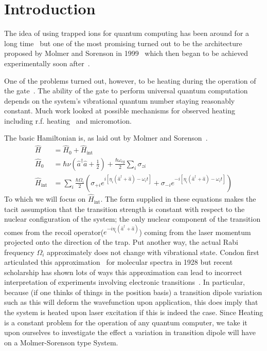 \section{Introduction}

The idea of using trapped ions for quantum computing has been around for a long time~\cite{Shore1993,Meekhof1996} but one of the most promising turned out to be the architecture proposed by Molmer and Sorenson in 1999~\cite{MolmerSorenson} which then began to be achieved experimentally soon after~\cite{Wineland2000,Monroe2000}.

One of the problems turned out, however, to be heating during the operation of the gate~\cite{Berkeland1998,HAFFNER2008,Johnson2016}.  The ability of the gate to perform universal quantum computation depends on the system's vibrational quantum number staying reasonably constant.  Much work looked at possible mechanisms for observed heating including r.f. heating~\cite{Turchette2000} and micromotion.

The basic Hamiltonian is, as laid out by Molmer and Sorenson~\cite{MolmerSorenson}.
\begin{align*}
  \hat{H} &= \hat{H}_0 + \hat{H}_{\text{int}} \\
  \hat{H}_0 &= \hbar \nu \left(  \hat{a}^{\dagger} \hat{a}   + \frac{1}{2}\right)  + \frac{\hbar \omega_{eg}}{2} \sum_{i} \sigma_{zi} \\
  \hat{H}_{\text{int}} &= \sum_{i} \frac{\hbar \Omega_i}{2} \left( \sigma_{+i} e^{i \left[ \eta_i \left( \hat{a}^{\dagger} + \hat{a} \right) - \omega_i t \right]}  +  \sigma_{-i} e^{-i \left[ \eta_i \left( \hat{a}^{\dagger} + \hat{a} \right) - \omega_i t \right]} \right)
\end{align*}
To which we will focus on $\hat{H}_{\text{int}}$.  The form supplied in these equations makes the tacit assumption that the transition strength is constant with respect to the nuclear configuration of the system; the only nuclear component of the transition comes from the recoil operator($e^{-i  \eta_i \left( \hat{a}^{\dagger} + \hat{a} \right) }$) coming from the laser momentum projected onto the direction of the trap.  Put another way, the actual Rabi frequency $\Omega_i$ approximately does not change with vibrational state.  Condon first articulated this approximation~\cite{Condon} for molecular spectra in 1928 but recent scholarship has shown lots of ways this approximation can lead to incorrect interpretation of experiments involving electronic transitions~\cite{MavrosNonCondon,hellerGraphene,photosyntheticKappa}. In particular, because (if one thinks of things in the position basis) a transition dipole variation such as this will deform the wavefunction upon application, this does imply that the system is heated upon laser excitation if this is indeed the case.  Since Heating is a constant problem for the operation of any quantum computer, we take it upon ourselves to investigate the effect a variation in transition dipole will have on a Molmer-Sorenson type System.


